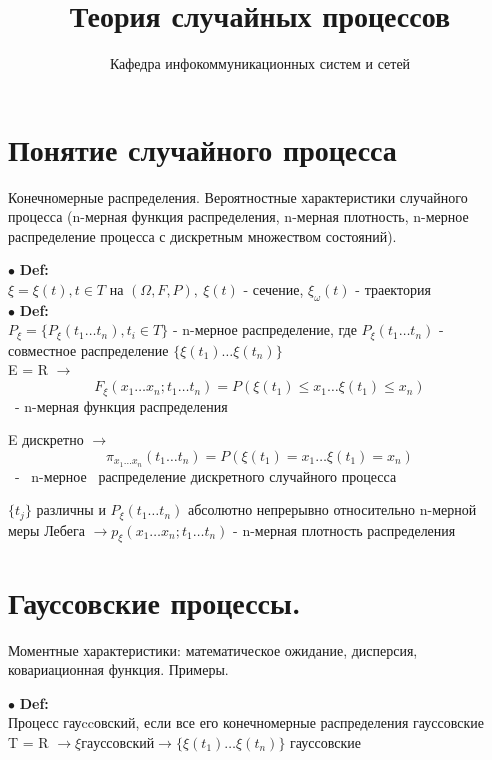 \documentclass[11pt]{article}
\title{Теория случайных процессов}
\author{Кафедра инфокоммуникационных систем и сетей}
\begin{document}
\maketitle

\section{Понятие случайного процесса}
\begin{center} Конечномерные распределения. Вероятностные характеристики случайного процесса (n-мерная функция распределения, n-мерная плотность, n-мерное распределение процесса с дискретным множеством состояний). \end{center}

$\bullet$ \textbf{Def:} \\
$\xi = {\xi(t), t \in T}$ на $(\Omega, F, P), \ \xi(t)$ - сечение, $\xi_\omega(t)$ - траектория \\

$\bullet$ \textbf{Def:} \\
$P_\xi = \{P_\xi(t_1 \ldots t_n), t_i \in T\}$ - n-мерное	распределение, где $P_\xi(t_1 \ldots t_n)$ - совместное распределение $\{\xi(t_1) \ldots \xi(t_n)\}$ \\
E = R $ \rightarrow$ $$F_\xi(x_1 \ldots x_n;t_1 \ldots t_n) = P(\xi(t_1) \leq x_1 \ldots \xi(t_1) \leq x_n)$$ \ - n-мерная функция распределения

E дискретно $\rightarrow$ $$\pi_{x_1 \ldots x_n}(t_1 \ldots t_n) = P(\xi(t_1) = x_1 \ldots \xi(t_1) = x_n)$$ \ - \ n-мерное \ распределение дискретного случайного процесса

$\{t_j\}$ различны и $P_\xi(t_1 \ldots t_n)$ абсолютно непрерывно относительно n-мерной меры Лебега $\longrightarrow p_\xi(x_1 \ldots x_n;t_1 \ldots t_n)$ - n-мерная плотность распределения 

\section{Гауссовские процессы.}
\begin{center} Моментные характеристики: математическое ожидание, дисперсия, ковариационная функция. Примеры. \end{center}
$\bullet$ \textbf{Def:} \\ Процесс гауccовский, если все его конечномерные распределения гауссовские \\
T = R $\longrightarrow \xi гауссовский \rightarrow \{\xi(t_1) \ldots \xi(t_n)\}$ гауссовские \\
\end{document}
